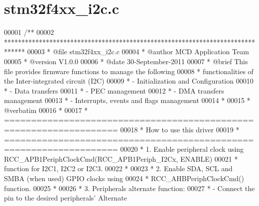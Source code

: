 \section{stm32f4xx\+\_\+i2c.\+c}
\label{stm32f4xx__i2c_8c_source}

\begin{DoxyCode}
00001 \textcolor{comment}{/**}
00002 \textcolor{comment}{  ******************************************************************************}
00003 \textcolor{comment}{  * @file    stm32f4xx\_i2c.c}
00004 \textcolor{comment}{  * @author  MCD Application Team}
00005 \textcolor{comment}{  * @version V1.0.0}
00006 \textcolor{comment}{  * @date    30-September-2011}
00007 \textcolor{comment}{  * @brief   This file provides firmware functions to manage the following }
00008 \textcolor{comment}{  *          functionalities of the Inter-integrated circuit (I2C)}
00009 \textcolor{comment}{  *           - Initialization and Configuration}
00010 \textcolor{comment}{  *           - Data transfers}
00011 \textcolor{comment}{  *           - PEC management}
00012 \textcolor{comment}{  *           - DMA transfers management}
00013 \textcolor{comment}{  *           - Interrupts, events and flags management }
00014 \textcolor{comment}{  *           }
00015 \textcolor{comment}{  *  @verbatim}
00016 \textcolor{comment}{  *    }
00017 \textcolor{comment}{  *          ===================================================================}
00018 \textcolor{comment}{  *                                 How to use this driver}
00019 \textcolor{comment}{  *          ===================================================================}
00020 \textcolor{comment}{  *          1. Enable peripheral clock using RCC\_APB1PeriphClockCmd(RCC\_APB1Periph\_I2Cx, ENABLE)}
00021 \textcolor{comment}{  *             function for I2C1, I2C2 or I2C3.}
00022 \textcolor{comment}{  *}
00023 \textcolor{comment}{  *          2. Enable SDA, SCL  and SMBA (when used) GPIO clocks using }
00024 \textcolor{comment}{  *             RCC\_AHBPeriphClockCmd() function. }
00025 \textcolor{comment}{  *}
00026 \textcolor{comment}{  *          3. Peripherals alternate function: }
00027 \textcolor{comment}{  *                 - Connect the pin to the desired peripherals' Alternate }

\end{DoxyCode}

